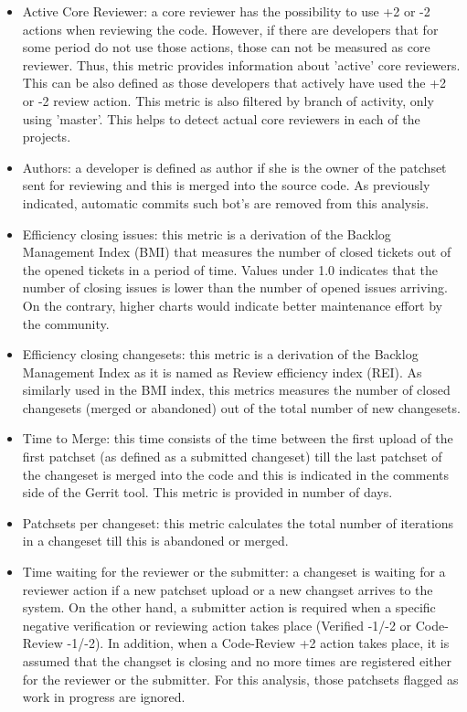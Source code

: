 \documentclass[a4wide,11pt]{report}
\begin{document}
\begin{itemize}
\item Active Core Reviewer: a core reviewer has the possibility to use +2 or -2 actions when reviewing the code. 
However, if there are developers that for some period do not use those actions, those can not be measured as core reviewer.
Thus, this metric provides information about 'active' core reviewers. This can be also defined as those developers
that actively have used the +2 or -2 review action. This metric is also filtered by branch of activity, only using 'master'.
This helps to detect actual core reviewers in each of the projects.

\item Authors: a developer is defined as author if she is the owner of the patchset sent for reviewing and this is 
merged into the source code. As previously indicated, automatic commits such bot's are removed from this analysis.

\item Efficiency closing issues: this metric is a derivation of the Backlog Management Index (BMI) that measures the number
of closed tickets out of the opened tickets in a period of time. Values under 1.0 indicates that the number of closing
issues is lower than the number of opened issues arriving. On the contrary, higher charts would indicate better
maintenance effort by the community.

\item Efficiency closing changesets: this metric is a derivation of the Backlog Management Index as it is named as
Review efficiency index (REI). As similarly used in the BMI index, this metrics measures the number of closed changesets
(merged or abandoned) out of the total number of new changesets.

\item Time to Merge: this time consists of the time between the first upload of the first patchset (as defined
as a submitted changeset) till the last patchset of the changeset is merged into the code and this is indicated in the 
comments side of the Gerrit tool. This metric is provided in number of days.

\item Patchsets per changeset: this metric calculates the total number of iterations in a changeset till this is abandoned
or merged.

\item Time waiting for the reviewer or the submitter: a changeset is waiting for a reviewer action if a new patchset upload
or a new changset arrives to the system. On the other hand, a submitter action is required when a specific negative verification
or reviewing action takes place (Verified -1/-2 or Code-Review -1/-2). In addition, when a Code-Review +2 action takes place,
it is assumed that the changset is closing and no more times are registered either for the reviewer or the submitter.
For this analysis, those patchsets flagged as work in progress are ignored.

\end{itemize}
\end{document}
